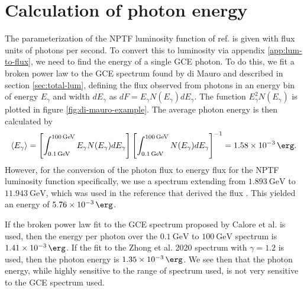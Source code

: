 \documentclass[a4paper,11pt]{article}
\newcommand{\brackets}[1]{\left[#1\right]}
\newcommand{\comment}[1]{\emph{\color{red}{#1}}}
\begin{document}
\section{Calculation of photon energy}
\label{app:photon-energy}
The parameterization of the NPTF luminosity function of ref. \cite{Lee:2015fea} is given with flux units of photons per second. To convert this to luminosity via appendix \ref{app:lum-to-flux}, we need to find the energy of a single GCE photon. To do this, we fit a broken power law to the GCE spectrum found by di Mauro and described in section \ref{sec:total-lum}, defining the flux observed from photons in an energy bin of energy $E_\gamma$ and width $dE_\gamma$ as $dF = E_\gamma N(E_\gamma)dE_\gamma$. The function $E_\gamma^2 N(E_\gamma)$ is plotted in figure \ref{fig:di-mauro-example}. The average photon energy is then calculated by
\begin{equation}
    \langle E_\gamma \rangle =  \brackets{\int_{\SI{0.1}{\giga\electronvolt}}^{\SI{100}{\giga\electronvolt}} E_\gamma N(E_\gamma) dE_\gamma} \brackets{\int_{\SI{0.1}{\giga\electronvolt}}^{\SI{100}{\giga\electronvolt}} N(E_\gamma) dE_\gamma}^{-1} = \SI{1.58e-3}{\erg}.
    \label{eqn:photon-energy}
\end{equation}
However, for the conversion of the photon flux to energy flux for the NPTF luminosity function specifically, we use a spectrum extending from $\SI{1.893}{\giga\electronvolt}$ to $\SI{11.943}{\giga\electronvolt}$, which was used in the reference that derived the flux \cite{Lee:2015fea}. This yielded an energy of $\SI{5.76e-3}{\erg}$.

If the broken power law fit to the GCE spectrum proposed by Calore et al. is used, then the energy per photon over the $\SI{0.1}{\giga\electronvolt}$ to $\SI{100}{\giga\electronvolt}$ spectrum is $\SI{1.41e-3}{\erg}$. If the fit to the Zhong et al. 2020 spectrum with $\gamma=1.2$ is used, then the photon energy is $\SI{1.35e-3}{\erg}$. We see then that the photon energy, while highly sensitive to the range of spectrum used, is not very sensitive to the GCE spectrum used.



\acknowledgments
\comment{We should probably acknowledge the Fermilab team for giving us their data. Anyone else?}










\end{document}

